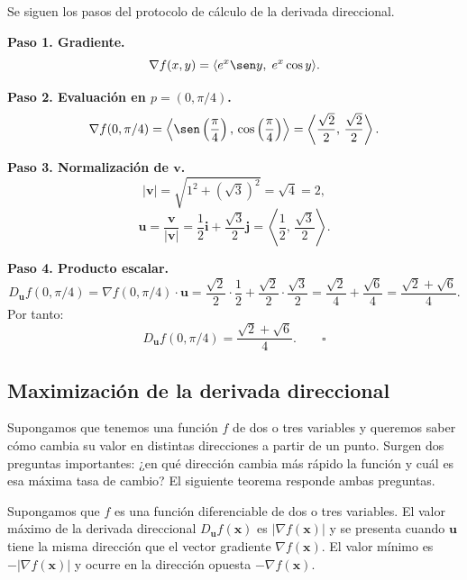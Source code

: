\begin{myproof}
Se siguen los pasos del protocolo de cálculo de la derivada direccional.

\textbf{Paso 1. Gradiente.}
\[
\nabla f(x,y) = \langle e^x \sen y,\; e^x \cos y \rangle.
\]

\textbf{Paso 2. Evaluación en $p=(0,\pi/4)$.}
\[
\nabla f(0,\pi/4)
= \left\langle \sen\left(\frac{\pi}{4}\right),\,
         \cos\left(\frac{\pi}{4}\right) \right\rangle
= \left\langle \frac{\sqrt{2}}{2},\, \frac{\sqrt{2}}{2} \right\rangle.
\]

\textbf{Paso 3. Normalización de $\mathbf{v}$.}
\[
|\mathbf{v}| = \sqrt{1^2 + (\sqrt{3})^2} = \sqrt{4} = 2,
\]
\[
\mathbf{u} = \frac{\mathbf{v}}{|\mathbf{v}|}
= \frac{1}{2}\mathbf{i} + \frac{\sqrt{3}}{2}\mathbf{j}
= \left\langle \frac{1}{2},\, \frac{\sqrt{3}}{2} \right\rangle.
\]

\textbf{Paso 4. Producto escalar.}
\[
D_{\mathbf{u}} f(0,\pi/4)
= \nabla f(0,\pi/4)\cdot \mathbf{u}
= \frac{\sqrt{2}}{2}\cdot\frac{1}{2}
  + \frac{\sqrt{2}}{2}\cdot\frac{\sqrt{3}}{2}
= \frac{\sqrt{2}}{4} + \frac{\sqrt{6}}{4}
= \frac{\sqrt{2}+\sqrt{6}}{4}.
\]
Por tanto:
\[
\boxed{D_{\mathbf{u}} f(0,\pi/4) = \frac{\sqrt{2}+\sqrt{6}}{4}}.
\qquad\square
\]
\end{myproof}

\subsection{Maximización de la derivada direccional}

Supongamos que tenemos una función $f$ de dos o tres variables y
queremos saber cómo cambia su valor en distintas direcciones a partir de
un punto. Surgen dos preguntas importantes: ¿en qué dirección cambia más
rápido la función y cuál es esa máxima tasa de cambio? El siguiente
teorema responde ambas preguntas.

\begin{theorem}
Supongamos que $f$ es una función diferenciable de dos o tres variables.
El valor máximo de la derivada direccional $D_{\mathbf{u}} f(\mathbf{x})$
es $|\nabla f(\mathbf{x})|$ y se presenta cuando $\mathbf{u}$ tiene la
misma dirección que el vector gradiente $\nabla f(\mathbf{x})$. El valor
mínimo es $-|\nabla f(\mathbf{x})|$ y ocurre en la dirección opuesta
$-\nabla f(\mathbf{x})$.
\end{theorem}

